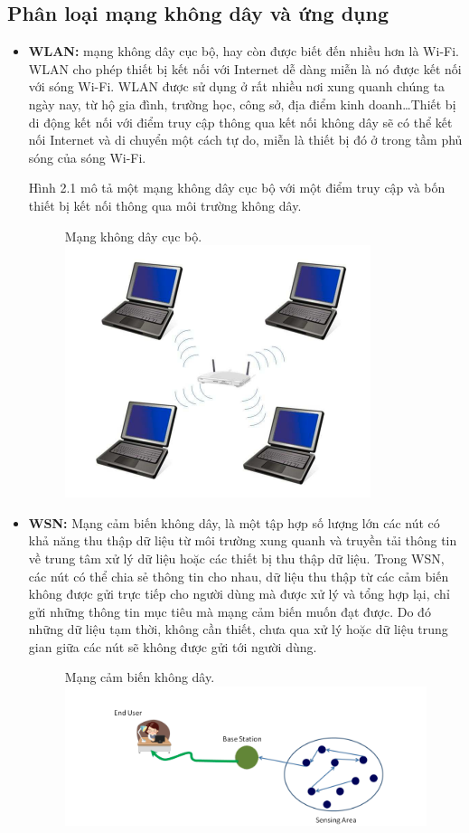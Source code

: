 \documentclass{uetgraduation}
\begin{document}
\subsection{Phân loại mạng không dây và ứng dụng}
\begin{itemize}
    \item \textbf{WLAN:} mạng không dây cục bộ, hay còn được biết đến nhiều hơn là Wi-Fi. WLAN cho phép thiết bị kết nối với Internet dễ dàng miễn là nó được kết nối với
    sóng Wi-Fi. WLAN được sử dụng ở rất nhiều nơi xung quanh chúng ta ngày nay, từ hộ gia đình, trường học, công sở, địa điểm kinh doanh\dots Thiết bị di động
    kết nối với điểm truy cập thông qua kết nối không dây sẽ có thể kết nối Internet và di chuyển một cách tự do, miễn là thiết bị đó ở trong tầm phủ sóng của
    sóng Wi-Fi.

    Hình 2.1 mô tả một mạng không dây cục bộ với một điểm truy cập và bốn thiết bị kết nối thông qua môi trường không dây.
    \begin{figure}{Mạng không dây cục bộ.}
        \centering
        \includegraphics[scale=0.6]{wlan}
        \label{fig:wlan}
    \end{figure}
    \item \textbf{WSN:} Mạng cảm biến không dây, là một tập hợp số lượng lớn các nút có khả năng thu thập dữ liệu từ môi trường xung quanh và truyền tải thông tin
    về trung tâm xử lý dữ liệu hoặc các thiết bị thu thập dữ liệu. Trong WSN, các nút có thể chia sẻ thông tin cho nhau, dữ liệu thu thập từ các cảm biến không được
    gửi trực tiếp cho người dùng mà được xử lý và tổng hợp lại, chỉ gửi những thông tin mục tiêu mà mạng cảm biến muốn đạt được. Do đó những dữ liệu tạm thời, không
    cần thiết, chưa qua xử lý hoặc dữ liệu trung gian giữa các nút sẽ không được gửi tới người dùng.
    \begin{figure}{Mạng cảm biến không dây.}
        \centering
        \includegraphics[scale=0.6]{wsn}
        \label{fig:wsn}
    \end{figure}


\end{itemize}
\end{document}
